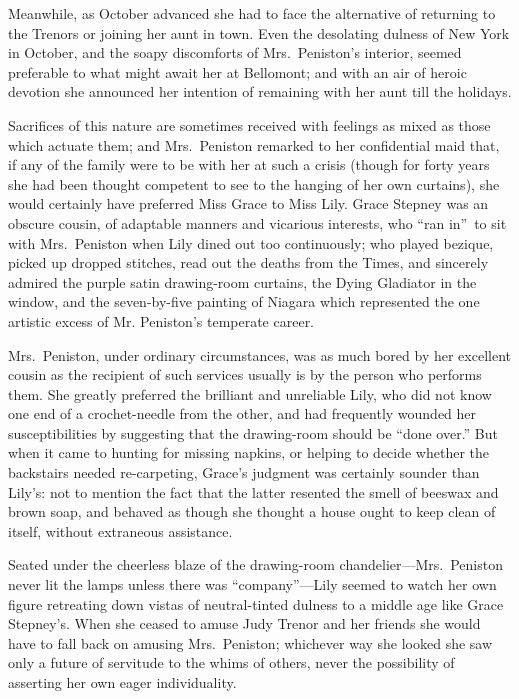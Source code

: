 \documentclass[12pt,a4paper]{book}
\begin{document}
Meanwhile, as October advanced she had to face the alternative of
returning to the Trenors or joining her aunt in town. Even the
desolating dulness of New York in October, and the soapy
discomforts of Mrs.\ Peniston's interior, seemed preferable to
what might await her at Bellomont; and with an air of heroic
devotion she announced her intention of remaining with her
aunt till the holidays.





Sacrifices of this nature are sometimes received with feelings as
mixed as those which actuate them; and Mrs.\ Peniston remarked to
her confidential maid that, if any of the family were to be with
her at such a crisis (though for forty years she had been thought
competent to see to the hanging of her own curtains), she would
certainly have preferred Miss Grace to Miss Lily. Grace Stepney
was an obscure cousin, of adaptable manners and vicarious
interests, who ``ran in''\ to sit with Mrs.\ Peniston when Lily dined
out too continuously; who played bezique, picked up dropped
stitches, read out the deaths from the Times, and sincerely
admired the purple satin drawing-room curtains, the Dying
Gladiator in the window, and the seven-by-five painting of
Niagara which represented the one artistic excess of Mr.
Peniston's temperate career.





Mrs.\ Peniston, under ordinary circumstances, was as much
bored by her excellent cousin as the recipient of such services
usually is by the person who performs them. She greatly preferred
the brilliant and unreliable Lily, who did not know one end of a
crochet-needle from the other, and had frequently wounded her
susceptibilities by suggesting that the drawing-room should be
``done over.'' But when it came to hunting for missing napkins, or
helping to decide whether the backstairs needed re-carpeting,
Grace's judgment was certainly sounder than Lily's: not to
mention the fact that the latter resented the smell of beeswax
and brown soap, and behaved as though she thought a house ought
to keep clean of itself, without extraneous assistance.





Seated under the cheerless blaze of the drawing-room
chandelier---Mrs.\ Peniston never lit the lamps unless there was
``company''---Lily seemed to watch her own figure retreating down
vistas of neutral-tinted dulness to a middle age like Grace
Stepney's. When she ceased to amuse Judy Trenor and her friends
she would have to fall back on amusing Mrs.\ Peniston; whichever
way she looked she saw only a future of servitude to the whims of
others, never the possibility of asserting her own eager
individuality.
\end{document}
